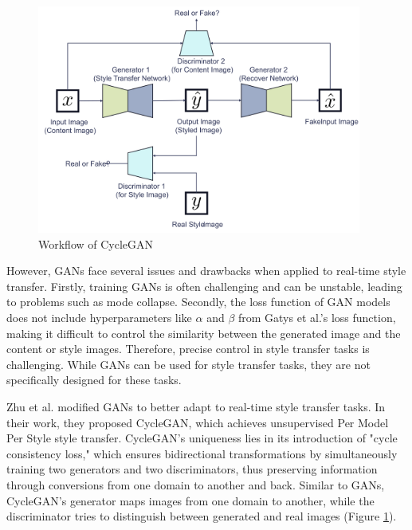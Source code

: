 \documentclass[preprint,12pt]{elsarticle}
\begin{document}
\begin{figure}[!htbp]%
    \centering%
    \includegraphics[width=0.95\textwidth]{Figure_7__Workflow_of_CycleGAN.pdf}
    \caption{Workflow of CycleGAN \citep{37zhu2017unpaired}}\label{fig7_Zhu}
\end{figure}

However, GANs face several issues and drawbacks when applied to real-time style transfer. Firstly, training GANs is often challenging and can be unstable, leading to problems such as mode collapse. Secondly, the loss function of GAN models does not include hyperparameters like $\alpha$ and $\beta$ from Gatys et al.’s\citep{02gatys2016image} loss function, making it difficult to control the similarity between the generated image and the content or style images. Therefore, precise control in style transfer tasks is challenging. While GANs can be used for style transfer tasks, they are not specifically designed for these tasks.

Zhu et al.\citep{37zhu2017unpaired} modified GANs\citep{38goodfellow2014generative} to better adapt to real-time style transfer tasks. In their work\citep{37zhu2017unpaired}, they proposed CycleGAN, which achieves unsupervised Per Model Per Style style transfer. CycleGAN's uniqueness lies in its introduction of "cycle consistency loss," which ensures bidirectional transformations by simultaneously training two generators and two discriminators, thus preserving information through conversions from one domain to another and back. Similar to GANs, CycleGAN\citep{37zhu2017unpaired}'s generator maps images from one domain to another, while the discriminator tries to distinguish between generated and real images (Figure \ref{fig7_Zhu}).
\end{document}
